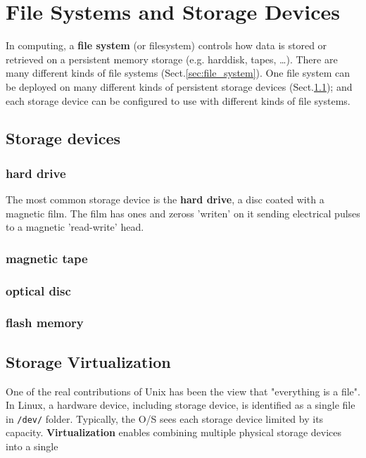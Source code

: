 \chapter{File Systems and Storage Devices}
\label{chap:file_system}

In computing, a {\bf file system} (or filesystem) controls how data is stored or
retrieved on a persistent memory storage (e.g. harddisk, tapes, \ldots). There
are many different kinds of file systems (Sect.\ref{sec:file_system}). One file
system can be deployed on many different kinds of persistent storage devices
(Sect.\ref{sec:storage_devices}); and each storage device can be configured to
use with different kinds of file systems.

\section{Storage devices}
\label{sec:storage_devices}

\subsection{hard drive}

The most common storage device is the {\bf hard drive}, a disc coated with a
magnetic film. The film has ones and zeross 'writen' on it sending electrical
pulses to a magnetic 'read-write' head.

\subsection{magnetic tape}

\subsection{optical disc}

\subsection{flash memory}

\section{Storage Virtualization}
\label{sec:storage_virtualization}

One of the real contributions of Unix has been the view that "everything is a
file". In Linux, a hardware device, including storage device, is identified as a single
file in \verb!/dev/! folder. Typically, the O/S sees each storage device 
limited by its capacity.
{\bf Virtualization} enables combining multiple physical storage devices into a
single 

